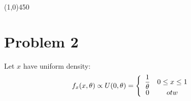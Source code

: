 \documentclass[12pt]{article}
\begin{document}
\begin{center}
\line(1,0){450}
\end{center}


\section{Problem 2}
Let $x$ have uniform density:
\begin{align}
f_x(x,\theta) \propto U(0,\theta) = \left\{ \begin{array}{c c}
\mathlarger{\frac{1}{\theta}} & 0 \leq x \leq 1 \\
0 & otw
\end{array} \right.
\end{align}
\end{document}

